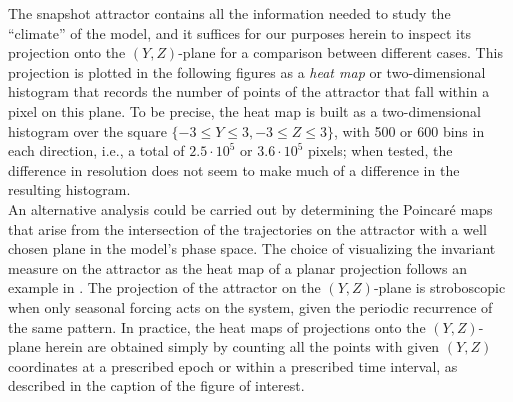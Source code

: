 \documentclass[%
 aip, cha,
 amsmath,amssymb,
 reprint,%
author-year,%
]{revtex4-1}
\newcommand{\0}{\mathbf 0}
\begin{document}
The snapshot attractor contains all the information needed to study the ``climate'' of the model, and it suffices for our purposes herein to inspect its projection onto the $(Y,Z)$-plane for a comparison between different cases. This projection is plotted in the following figures as a {\em heat map} or two-dimensional histogram \citep{Wilkinson.2009, keno} that records the number of points of the attractor that fall within a pixel on this plane. To be precise, the heat map is built as a two-dimensional histogram over the square $\{-3 \le  Y \le 3, -3 \le Z \le 3\}$, with 500 or 600 bins in each direction, i.e., a total of $2.5 \cdot 10^5$ or $3.6 \cdot 10^5$ pixels; when tested, the difference in resolution does not seem to make much of a difference in the resulting histogram. \\
An alternative analysis could be carried out by determining the Poincaré maps that arise from the intersection of the trajectories on the attractor with a well chosen plane in the model's phase space. The choice of visualizing the invariant measure on the attractor as the heat map of a planar projection follows an example in \cite{keno}. The projection of the attractor on the $(Y,Z)$-plane is stroboscopic when only seasonal forcing acts on the system, given the periodic recurrence of the same pattern. In practice, the heat maps of projections onto the $(Y, Z)$-plane herein are obtained simply by counting all the points with given $(Y, Z)$ coordinates at a prescribed epoch or within a prescribed time interval, as described in the caption of the figure of interest. \\
\end{document}
